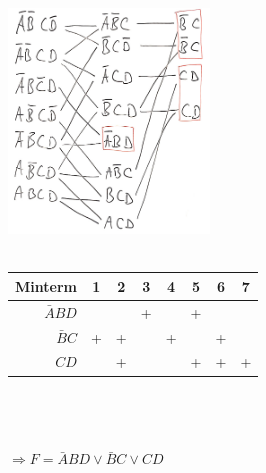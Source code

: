 \documentclass{article}
\begin{document}
    \includegraphics[width=0.4\textwidth]{Bild.jpg}\\\\
    \begin{tabular}{r|ccccccc}
        Minterm & 1 & 2 & 3 & 4 & 5 & 6 & 7 \\
        \hline
        $\bar{A}BD$ & &&+&&+&&\\
        $\bar{B}C$  & +&+&&+&&+&\\
        $CD$        & & +& & & +& + &+ 
    \end{tabular}\\\\\\
    $\Rightarrow F = \bar{A}BD \lor \bar{B}C \lor CD$
\end{document}
